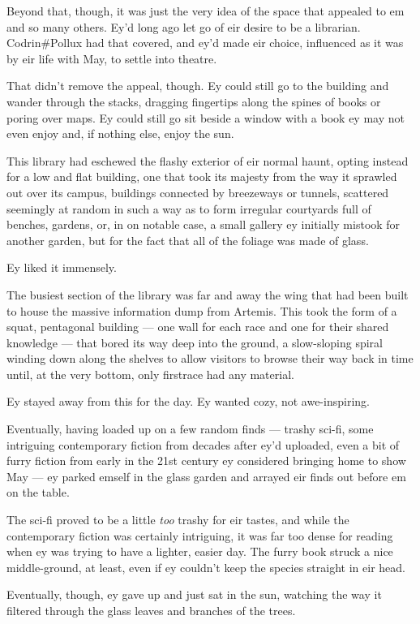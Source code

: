 Beyond that, though, it was just the very idea of the space that appealed to em and so many others. Ey'd long ago let go of eir desire to be a librarian. Codrin\#Pollux had that covered, and ey'd made eir choice, influenced as it was by eir life with May, to settle into theatre.

That didn't remove the appeal, though. Ey could still go to the building and wander through the stacks, dragging fingertips along the spines of books or poring over maps. Ey could still go sit beside a window with a book ey may not even enjoy and, if nothing else, enjoy the sun.

This library had eschewed the flashy exterior of eir normal haunt, opting instead for a low and flat building, one that took its majesty from the way it sprawled out over its campus, buildings connected by breezeways or tunnels, scattered seemingly at random in such a way as to form irregular courtyards full of benches, gardens, or, in on notable case, a small gallery ey initially mistook for another garden, but for the fact that all of the foliage was made of glass.

Ey liked it immensely.

The busiest section of the library was far and away the wing that had been built to house the massive information dump from Artemis. This took the form of a squat, pentagonal building — one wall for each race and one for their shared knowledge — that bored its way deep into the ground, a slow-sloping spiral winding down along the shelves to allow visitors to browse their way back in time until, at the very bottom, only firstrace had any material.

Ey stayed away from this for the day. Ey wanted cozy, not awe-inspiring.

Eventually, having loaded up on a few random finds — trashy sci-fi, some intriguing contemporary fiction from decades after ey'd uploaded, even a bit of furry fiction from early in the 21st century ey considered bringing home to show May — ey parked emself in the glass garden and arrayed eir finds out before em on the table.

The sci-fi proved to be a little \emph{too} trashy for eir tastes, and while the contemporary fiction was certainly intriguing, it was far too dense for reading when ey was trying to have a lighter, easier day. The furry book struck a nice middle-ground, at least, even if ey couldn't keep the species straight in eir head.

Eventually, though, ey gave up and just sat in the sun, watching the way it filtered through the glass leaves and branches of the trees.

